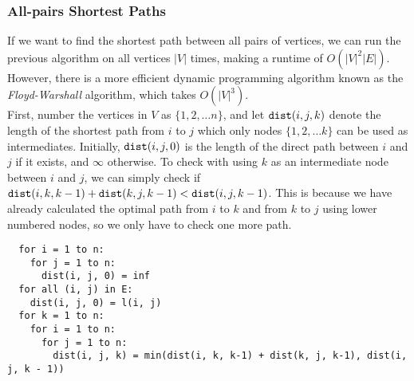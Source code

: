 \subsubsection{All-pairs Shortest Paths}
If we want to find the shortest path between all pairs of vertices, we can run the previous algorithm on all vertices $|V|$ times, making a runtime of $O(|V|^2 |E|)$.
However, there is a more efficient dynamic programming algorithm known as the \textit{Floyd-Warshall} algorithm, which takes $O(|V|^3)$.\\
First, number the vertices in $V$ as $\{1, 2,\ldots n\}$, and let $\verb|dist|(i, j, k)$ denote the length of the shortest path from $i$ to $j$ which only nodes $\{1, 2,\ldots k\}$ can be used as intermediates.
Initially, $\verb|dist|(i, j, 0)$ is the length of the direct path between $i$ and $j$ if it exists, and $\infty$ otherwise.
To check with using $k$ as an intermediate node between $i$ and $j$, we can simply check if $\verb|dist|(i, k, k-1) + \verb|dist|(k, j, k-1) < \verb|dist|(i, j, k-1)$.
This is because we have already calculated the optimal path from $i$ to $k$ and from $k$ to $j$ using lower numbered nodes, so we only have to check one more path.
\begin{verbatim}
  for i = 1 to n:
    for j = 1 to n:
      dist(i, j, 0) = inf
  for all (i, j) in E:
    dist(i, j, 0) = l(i, j)
  for k = 1 to n:
    for i = 1 to n:
      for j = 1 to n:
        dist(i, j, k) = min(dist(i, k, k-1) + dist(k, j, k-1), dist(i, j, k - 1))
\end{verbatim}

